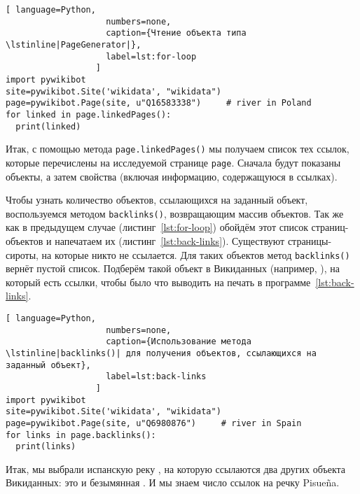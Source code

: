 \begin{lstlisting}[ language=Python,
                    numbers=none,
                    caption={Чтение объекта типа \lstinline|PageGenerator|},
                    label=lst:for-loop
                  ]
import pywikibot
site=pywikibot.Site('wikidata', "wikidata")
page=pywikibot.Page(site, u"Q16583338")     # river in Poland
for linked in page.linkedPages():
  print(linked)
\end{lstlisting}

Итак, с помощью метода \lstinline|page.linkedPages()| мы получаем список тех ссылок, 
которые перечислены на исследуемой странице \lstinline|page|. 
Сначала будут показаны объекты, а затем свойства (включая информацию, содержащуюся в ссылках).

Чтобы узнать количество объектов, ссылающихся на заданный объект, 
воспользуемся методом \lstinline|backlinks()|, возвращающим массив объектов. 
Так же как в предыдущем случае (листинг~\ref{lst:for-loop}) обойдём этот список страниц-объектов 
и напечатаем их (листинг~\ref{lst:back-links}). 
Существуют страницы-сироты, 
на которые никто не ссылается. 
Для таких объектов метод \lstinline|backlinks()| вернёт пустой список. 
Подберём такой объект в Викиданных (например, ), 
на который есть ссылки, чтобы было что выводить на печать в программе~\ref{lst:back-links}.

\begin{lstlisting}[ language=Python,
                    numbers=none,
                    caption={Использование метода \lstinline|backlinks()| для получения объектов, ссылающихся на заданный объект},
                    label=lst:back-links
                  ]
import pywikibot
site=pywikibot.Site('wikidata', "wikidata")
page=pywikibot.Page(site, u"Q6980876")     # river in Spain
for links in page.backlinks():
  print(links)
\end{lstlisting}

Итак, мы выбрали испанскую реку , на которую ссылаются 
два других объекта Викиданных: это  и безымянная . 
И мы знаем число ссылок на речку Pisueña. 


